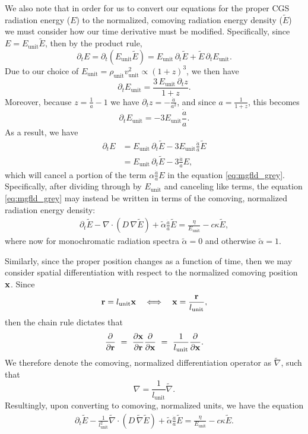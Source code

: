 \documentclass[10pt]{article}
\renewcommand{\(}{\left(}
\renewcommand{\)}{\right)}
\newcommand{\xvec}{{\bf x}}
\newcommand{\rvec}{{\bf r}}
\newcommand{\adot}{\dot{a}}
\newcommand{\Lunit}{l_{\text{unit}}}
\newcommand{\Dunit}{\rho_{\text{unit}}}
\newcommand{\Vunit}{v_{\text{unit}}}
\newcommand{\Eunit}{E_{\text{unit}}}
\newcommand{\tE}{\tilde{E}}
\newcommand{\talpha}{\tilde{\alpha}}
\newcommand{\tnabla}{\tilde{\nabla}}
\begin{document}
We also note that in order for us to convert our equations
for the proper CGS radiation energy ($E$) to the normalized,
comoving radiation energy density ($\tE$) we must consider how our
time derivative must be modified.  Specifically, since $E = \Eunit
\tE$, then by the product rule,
\[
   \partial_t E = \partial_t \left(\Eunit \tE\right) = 
   \Eunit\, \partial_t \tE + \tE\, \partial_t \Eunit.
\]
Due to our choice of $\Eunit = \Dunit \Vunit^2 \propto (1+z)^3$, we then have 
\[
   \partial_t \Eunit = \frac{3\, \Eunit\, \partial_t z}{1+z}.
\]
Moreover, because $z = \frac{1}{a}-1$ we have $\partial_t z =
-\frac{\adot}{a^2}$, and since $a = \frac{1}{1+z}$, this becomes 
\[
   \partial_t \Eunit = -3\Eunit\frac{\adot}{a}.
\]
As a result, we have 
\begin{align*}
   \partial_t E &= \Eunit\, \partial_t \tE - 3\Eunit \frac{\adot}{a} \tE \\
   &= \Eunit\, \partial_t \tE - 3\frac{\adot}{a} E,
\end{align*}
which will cancel a portion of the term $\alpha\frac{\adot}{a} E$ in
the equation \eqref{eq:mgfld_grey}.  Specifically, after dividing
through by $\Eunit$ and canceling like terms, the equation
\eqref{eq:mgfld_grey} may instead be written in terms of the comoving,
normalized radiation energy density: 
\begin{align}
  \label{eq:mgfld_grey_Ecomoving}
  \partial_{t} \tE - \nabla\cdot\(D\,\nabla \tE\)
    + \talpha\frac{\adot}{a} \tE = \frac{\eta}{\Eunit} - c\kappa \tE,
\end{align}
where now for monochromatic radiation spectra $\talpha=0$ and
otherwise $\talpha=1$.

Similarly, since the proper position changes as a function of time,
then we may consider spatial differentiation with respect to the
normalized comoving position $\xvec$.  Since 
\[
   \rvec = \Lunit \xvec \quad\Longleftrightarrow\quad
   \xvec = \frac{\rvec}{\Lunit},
\]
then the chain rule dictates that
\[
   \frac{\partial}{\partial \rvec} \ = \
   \frac{\partial \xvec}{\partial \rvec}
   \frac{\partial}{\partial \xvec} \ = \
   \frac{1}{\Lunit}\frac{\partial}{\partial \xvec}.
\]
We therefore denote the comoving, normalized differentiation operator
as $\tnabla$, such that 
\[
   \nabla = \frac{1}{\Lunit}\tnabla.
\]
Resultingly, upon converting to comoving, normalized units, we have
the equation
\begin{align}
  \label{eq:mgfld_grey_comoving}
  \partial_{t} \tE - \frac{1}{\Lunit^2}\tnabla\cdot\(D\,\tnabla \tE\)
    + \talpha\frac{\adot}{a} \tE = \frac{\eta}{\Eunit} - c\kappa \tE.
\end{align}
\end{document}
